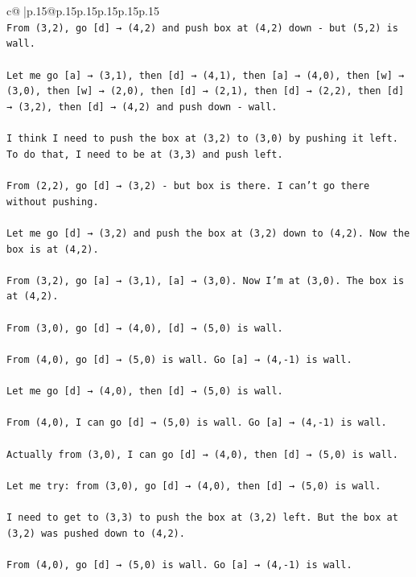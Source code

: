 \documentclass{article}
\begin{document}
{\begin{supertabular}{c@{$\;$}|p{.15\linewidth}@{}p{.15\linewidth}p{.15\linewidth}p{.15\linewidth}p{.15\linewidth}p{.15\linewidth}}
{{{\\ 
\texttt{From (3,2), go {[}d{]} → (4,2) and push box at (4,2) down {-} but (5,2) is wall.} \\
\\ 
\texttt{Let me go {[}a{]} → (3,1), then {[}d{]} → (4,1), then {[}a{]} → (4,0), then {[}w{]} → (3,0), then {[}w{]} → (2,0), then {[}d{]} → (2,1), then {[}d{]} → (2,2), then {[}d{]} → (3,2), then {[}d{]} → (4,2) and push down {-} wall.} \\
\\ 
\texttt{I think I need to push the box at (3,2) to (3,0) by pushing it left. To do that, I need to be at (3,3) and push left.} \\
\\ 
\texttt{From (2,2), go {[}d{]} → (3,2) {-} but box is there. I can't go there without pushing.} \\
\\ 
\texttt{Let me go {[}d{]} → (3,2) and push the box at (3,2) down to (4,2). Now the box is at (4,2).} \\
\\ 
\texttt{From (3,2), go {[}a{]} → (3,1), {[}a{]} → (3,0). Now I'm at (3,0). The box is at (4,2).} \\
\\ 
\texttt{From (3,0), go {[}d{]} → (4,0), {[}d{]} → (5,0) is wall.} \\
\\ 
\texttt{From (4,0), go {[}d{]} → (5,0) is wall. Go {[}a{]} → (4,{-}1) is wall.} \\
\\ 
\texttt{Let me go {[}d{]} → (4,0), then {[}d{]} → (5,0) is wall. } \\
\\ 
\texttt{From (4,0), I can go {[}d{]} → (5,0) is wall. Go {[}a{]} → (4,{-}1) is wall.} \\
\\ 
\texttt{Actually from (3,0), I can go {[}d{]} → (4,0), then {[}d{]} → (5,0) is wall. } \\
\\ 
\texttt{Let me try: from (3,0), go {[}d{]} → (4,0), then {[}d{]} → (5,0) is wall. } \\
\\ 
\texttt{I need to get to (3,3) to push the box at (3,2) left. But the box at (3,2) was pushed down to (4,2).} \\
\\ 
\texttt{From (4,0), go {[}d{]} → (5,0) is wall. Go {[}a{]} → (4,{-}1) is wall.} \\
}}}
\end{supertabular}}
\end{document}
